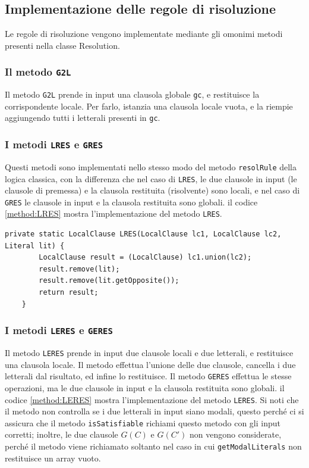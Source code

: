\documentclass[a4paper,12pt]{report}
\begin{document}
\subsection*{Implementazione delle regole di risoluzione}
Le regole di risoluzione vengono implementate mediante gli omonimi metodi presenti nella classe Resolution.

\subsubsection{Il metodo \texttt{G2L}}
Il metodo \texttt{G2L} prende in input una clausola globale \texttt{gc}, e restituisce la corrispondente locale. Per farlo, istanzia una clausola locale vuota, e la riempie aggiungendo tutti i letterali presenti in \texttt{gc}.

\subsubsection{I metodi \texttt{LRES} e \texttt{GRES}}
Questi metodi sono implementati nello stesso modo del metodo \texttt{resolRule} della logica classica, con la differenza che nel caso di \texttt{LRES}, le due clausole in input (le clausole di premessa) e la clausola restituita (risolvente) sono locali, e nel caso di \texttt{GRES} le clausole in input e la clausola restituita sono globali. il codice \ref{method:LRES} mostra l'implementazione del metodo \texttt{LRES}.

\begin{minipage}{\linewidth}
    \small
    \begin{lstlisting}[caption={Metodo \texttt{LRES} della classe \texttt{Resolution}}, label={method:LRES}]
    private static LocalClause LRES(LocalClause lc1, LocalClause lc2, Literal lit) {
        LocalClause result = (LocalClause) lc1.union(lc2);
        result.remove(lit);
        result.remove(lit.getOpposite());
        return result;
    }
    \end{lstlisting}
\end{minipage}

\subsubsection{I metodi \texttt{LERES} e \texttt{GERES}}
Il metodo \texttt{LERES} prende in input due clausole locali e due letterali, e restituisce una clausola locale. Il metodo effettua l'unione delle due clausole, cancella i due letterali dal risultato, ed infine lo restituisce. Il metodo \texttt{GERES} effettua le stesse operazioni, ma le due clausole in input e la clausola restituita sono globali. il codice \ref{method:LERES} mostra l'implementazione del metodo \texttt{LERES}. Si noti che il metodo non controlla se i due letterali in input siano modali, questo perché ci si assicura che il metodo \texttt{isSatisfiable} richiami questo metodo con gli input corretti; inoltre, le due clausole $G(C)$ e $G(C')$ non vengono considerate, perché il metodo viene richiamato soltanto nel caso in cui \texttt{getModalLiterals} non restituisce un array vuoto.
\end{document}
